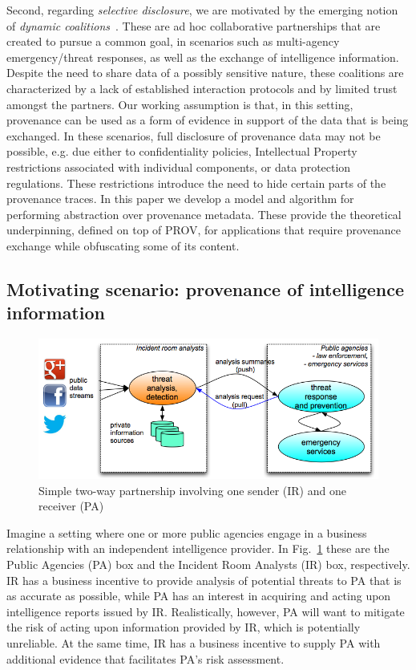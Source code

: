Second, regarding \textit{selective disclosure}, we are motivated by the emerging notion of \textit{dynamic coalitions}~\citep{BFJM06}.
%
These are ad hoc collaborative partnerships that are created 
to pursue a common goal, in scenarios such as multi-agency emergency/threat responses, as well as the exchange of intelligence information. 
%
Despite the need to share data of a possibly sensitive nature, these coalitions are characterized by a lack of established interaction protocols and by limited trust amongst the partners. 
%
Our working assumption is that, in this setting, provenance can be used as a form of evidence in support of the data that is being exchanged. 
%
In these scenarios, full disclosure of provenance data may not be possible, e.g. due either to confidentiality policies, Intellectual Property restrictions associated with individual components, or data protection regulations. These restrictions introduce the need to hide certain parts of the provenance traces. 
%
In this paper we develop a model and algorithm for performing  abstraction over provenance metadata. These provide the theoretical underpinning, defined on top of PROV, for applications that require provenance exchange while obfuscating some of its content.

\subsection{Motivating scenario: provenance of intelligence information}
%

\begin{figure}
\centering
\includegraphics[scale=.35]{figures/intelligence-scenario.png} 
\caption{Simple two-way partnership involving one sender (IR) and one receiver (PA)}
\label{fig:scenario}
\end{figure}

Imagine a setting where one or more public agencies engage in a business relationship with an independent intelligence provider. 
%
In Fig.~\ref{fig:scenario} these are the Public Agencies (PA) box and the Incident Room Analysts (IR) box, respectively.
%
IR has a business incentive to provide analysis of potential threats to PA that is as accurate as possible, while PA has an interest in acquiring and acting upon intelligence reports issued by IR.
%
Realistically, however, PA will want to mitigate the risk of acting upon information provided by IR, which is potentially unreliable. At the same time, IR has a business incentive to supply PA with additional evidence that facilitates PA's risk assessment.
%

